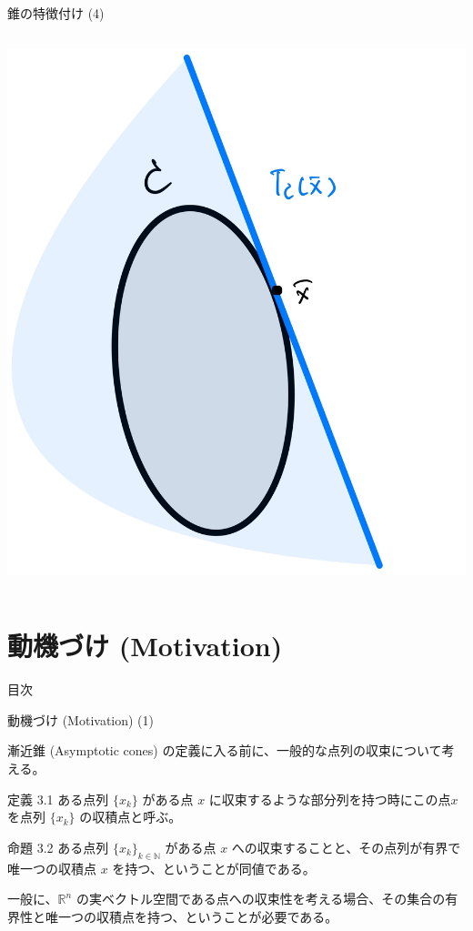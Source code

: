 \documentclass[aspectratio=169, dvipdfmx, 11pt]{beamer} %
\begin{document}
\begin{frame}{錐の特徴付け (4)}
\begin{columns}
\begin{column}{0.48\textwidth}
      \includegraphics[keepaspectratio, scale=0.06]{figures/tangent_cone_2.jpg}
    \end{column}
  \end{columns}
\end{frame}

\section{動機づけ (Motivation) }
\begin{frame}{目次}
    \tableofcontents[currentsection]
\end{frame}

\begin{frame}{動機づけ (Motivation) (1) }

  漸近錐 (Asymptotic cones) の定義に入る前に、一般的な点列の収束について考える。

  \begin{block}{定義 3.1}
    ある点列 $\{ x_k \}$ がある点 $x$ に収束するような部分列を持つ時にこの点$x$ を点列 $\{ x_k \}$ の収積点と呼ぶ。
  \end{block}

  \begin{block}{命題 3.2}
    ある点列 $\{ x_k \}_{k \in \mathbb{N}}$ がある点 $x$ への収束することと、その点列が有界で唯一つの収積点 $x$ を持つ、ということが同値である。
  \end{block}

  一般に、$\mathbb{R} ^n$ の実ベクトル空間である点への収束性を考える場合、その集合の有界性と唯一つの収積点を持つ、ということが必要である。
\end{frame}
\end{document}
